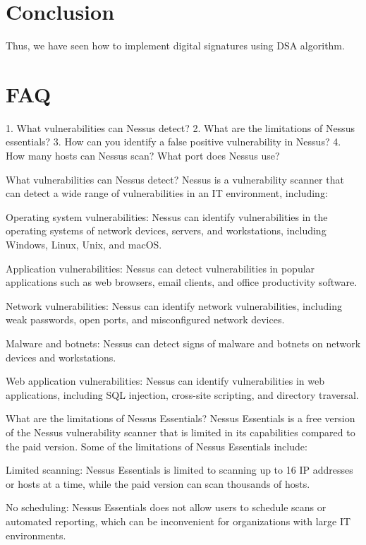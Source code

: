 \documentclass[11pt]{article}
\begin{document}
\section{Conclusion}
Thus, we have seen how to implement digital signatures using DSA algorithm.
\clearpage

\section{FAQ}

\begin{enumerate}

    1.
 What vulnerabilities can Nessus detect?
2.
 What are the limitations of Nessus essentials?
3.
 How can you identify a false positive vulnerability in Nessus?
4.
 How many hosts can Nessus scan? What port does Nessus use?

 
    What vulnerabilities can Nessus detect?
Nessus is a vulnerability scanner that can detect a wide range of vulnerabilities in an IT environment, including:

Operating system vulnerabilities: Nessus can identify vulnerabilities in the operating systems of network devices, servers, and workstations, including Windows, Linux, Unix, and macOS.

Application vulnerabilities: Nessus can detect vulnerabilities in popular applications such as web browsers, email clients, and office productivity software.

Network vulnerabilities: Nessus can identify network vulnerabilities, including weak passwords, open ports, and misconfigured network devices.

Malware and botnets: Nessus can detect signs of malware and botnets on network devices and workstations.

Web application vulnerabilities: Nessus can identify vulnerabilities in web applications, including SQL injection, cross-site scripting, and directory traversal.

What are the limitations of Nessus Essentials?
Nessus Essentials is a free version of the Nessus vulnerability scanner that is limited in its capabilities compared to the paid version. Some of the limitations of Nessus Essentials include:

Limited scanning: Nessus Essentials is limited to scanning up to 16 IP addresses or hosts at a time, while the paid version can scan thousands of hosts.

No scheduling: Nessus Essentials does not allow users to schedule scans or automated reporting, which can be inconvenient for organizations with large IT environments.


\end{enumerate}
\end{document}
